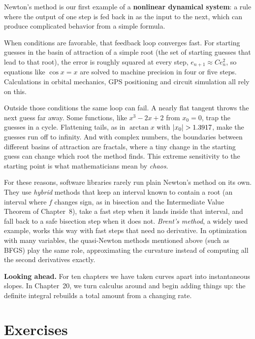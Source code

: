 \begin{connectionbox}
Newton's method is our first example of a \textbf{nonlinear dynamical system}:
a rule where the output of one step is fed back in as the input to the next,
which can produce complicated behavior from a simple formula.

When conditions are favorable, that feedback loop converges fast. For starting
guesses in the basin of attraction of a simple root (the set of starting guesses
that lead to that root), the error is roughly squared at every step,
$e_{n+1} \approx C e_n^2$, so equations like $\cos x = x$ are solved to machine
precision in four or five steps. Calculations in orbital mechanics, GPS
positioning and circuit simulation all rely on this.

Outside those conditions the same loop can fail. A nearly flat tangent throws the
next guess far away. Some functions, like $x^3 - 2x + 2$ from $x_0 = 0$, trap the
guesses in a cycle. Flattening tails, as in $\arctan x$ with $\lvert x_0\rvert > 1.3917$,
make the guesses run off to infinity. And with complex numbers, the boundaries
between different basins of attraction are fractals, where a tiny change in the
starting guess can change which root the method finds. This extreme sensitivity
to the starting point is what mathematicians mean by \emph{chaos}.

For these reasons, software libraries rarely run plain Newton's method on its own.
They use \emph{hybrid} methods that keep an interval known to contain a root (an
interval where $f$ changes sign, as in bisection and the Intermediate Value
Theorem of Chapter~8), take a fast step when it lands inside that interval, and
fall back to a safe bisection step when it does not. \emph{Brent's method}, a
widely used example, works this way with fast steps that need no derivative. In
optimization with many variables, the quasi-Newton methods mentioned above (such
as BFGS) play the same role, approximating the curvature instead of computing all
the second derivatives exactly.

\textbf{Looking ahead.} For ten chapters we have taken curves apart into
instantaneous slopes. In Chapter~20, we turn calculus around and begin adding things
up: the definite integral rebuilds a total amount from a changing rate.
\end{connectionbox}

\section{Exercises}
\label{ch19:exercises}

